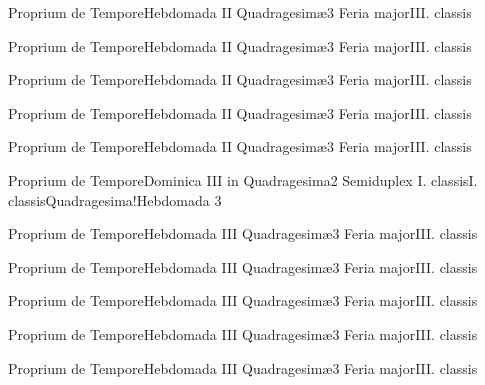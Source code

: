 \documentclass[liber-responsorialis.tex]{subfiles}
\begin{document}
	{Proprium de Tempore}{Hebdomada II Quadragesimæ}{3}{}
	{Feria major}{III. classis}{}
	{}
	{}

	{Proprium de Tempore}{Hebdomada II Quadragesimæ}{3}{}
	{Feria major}{III. classis}{}
	{}
	{}

	{Proprium de Tempore}{Hebdomada II Quadragesimæ}{3}{}
	{Feria major}{III. classis}{}
	{}
	{}

	{Proprium de Tempore}{Hebdomada II Quadragesimæ}{3}{}
	{Feria major}{III. classis}{}
	{}
	{}

	{Proprium de Tempore}{Hebdomada II Quadragesimæ}{3}{}
	{Feria major}{III. classis}{}
	{}
	{}

	{Proprium de Tempore}{Dominica III in Quadragesima}{2}{}
	{Semiduplex I. classis}{I. classis}{Quadragesima!Hebdomada 3}
	{}
	{}

	{Proprium de Tempore}{Hebdomada III Quadragesimæ}{3}{}
	{Feria major}{III. classis}{}
	{}
	{}

	{Proprium de Tempore}{Hebdomada III Quadragesimæ}{3}{}
	{Feria major}{III. classis}{}
	{}
	{}

	{Proprium de Tempore}{Hebdomada III Quadragesimæ}{3}{}
	{Feria major}{III. classis}{}
	{}
	{}

	{Proprium de Tempore}{Hebdomada III Quadragesimæ}{3}{}
	{Feria major}{III. classis}{}
	{}
	{}

	{Proprium de Tempore}{Hebdomada III Quadragesimæ}{3}{}
	{Feria major}{III. classis}{}
	{}
	{}
\end{document}
